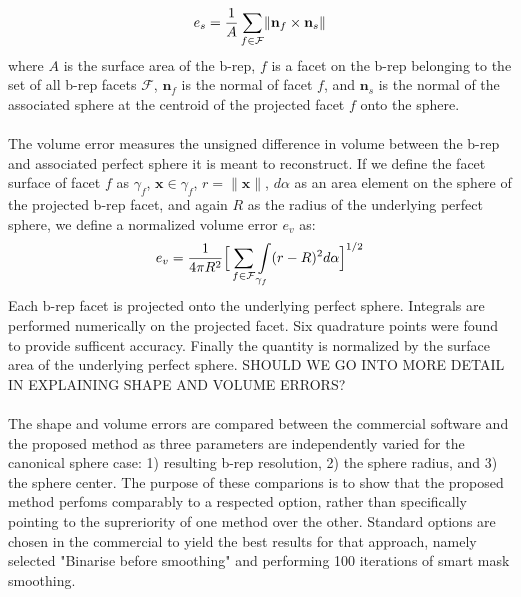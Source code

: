 \begin{equation} 
	e_s = \frac{1}{A} \sum \limits_{f\in\mathcal{F}} \lVert {\bf n}_f \times {\bf n}_s \rVert
\end{equation}
where $A$ is the surface area of the b-rep, $f$ is a facet on the b-rep belonging to the set of all b-rep facets $\mathcal{F}$, ${\bm n}_f$ is the normal of facet $f$, and ${\bm n}_s$ is the normal of the associated sphere at the centroid of the projected facet $f$ onto the sphere. \\ \\
%
The volume error measures the unsigned difference in volume between the b-rep and associated perfect sphere it is meant to reconstruct. If we define the facet surface of facet $f$ as $\gamma_f$,  ${\bm x} \in \gamma_f$, $r = \lVert {\bm x} \rVert$, $d\alpha$ as an area element on the sphere of the projected b-rep facet, and again $R$ as the radius of the underlying perfect sphere, we define a normalized volume error $e_v$ as:
\begin{equation}
	e_v = \frac{1}{4\pi R^2} \Big[\sum \limits_{f \in \mathcal{F}\textsl{}} \int \limits_{\gamma_f} (r - R)^2 d\alpha \Big]^{1/2}
\end{equation}
Each b-rep facet is projected onto the underlying perfect sphere. Integrals are performed numerically on the projected facet. Six quadrature points were found to provide sufficent accuracy. Finally the quantity is normalized by the surface area of the underlying perfect sphere. SHOULD WE GO INTO MORE DETAIL IN EXPLAINING SHAPE AND VOLUME ERRORS? 
\\ \\
%
The shape and volume errors are compared between the commercial software and the proposed method as three parameters are independently varied for the canonical sphere case: 1) resulting b-rep resolution, 2) the sphere radius, and 3) the sphere center. The purpose of these comparions is to show that the proposed method perfoms comparably to a respected option, rather than specifically pointing to the supreriority of one method over the other. Standard options are chosen in the commercial to yield the best results for that approach, namely selected "Binarise before smoothing" and performing 100 iterations of smart mask smoothing. \\ \\
%
